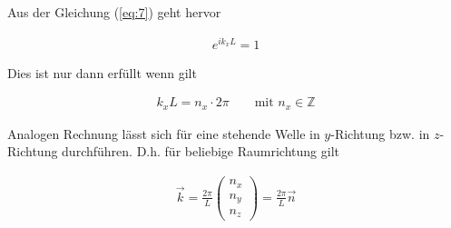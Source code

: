 Aus der Gleichung (\ref{eq:7}) geht hervor

\begin{align}
  \label{eq:6}
  e^{i k_x L} = 1
\end{align}

Dies ist nur dann erfüllt wenn gilt

\begin{align}
  \label{eq:8}
  k_x L = n_x\cdot 2\pi \qquad \text{mit }n_x\in \mathds Z
\end{align}

Analogen Rechnung lässt sich für eine stehende Welle in \(y\)-Richtung bzw. in \(z\)-Richtung durchführen. D.h. für beliebige Raumrichtung gilt

\begin{align}
  \label{eq:9}
  \vec k = \frac{2\pi}{L}
  \begin{pmatrix}
    n_x\\n_y\\n_z
  \end{pmatrix}
= \frac{2\pi}{L} \vec n
\end{align}




